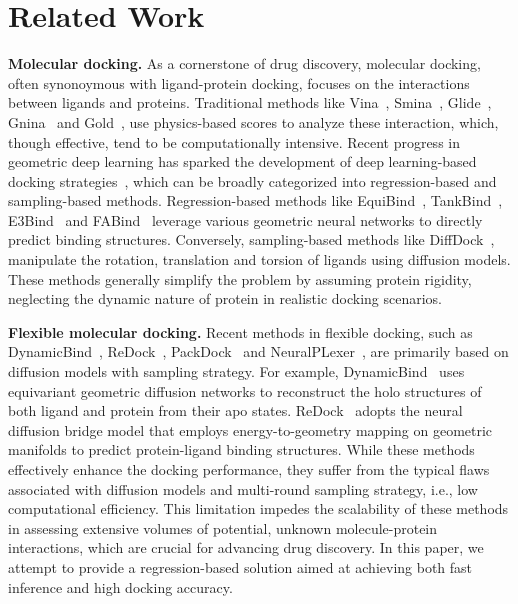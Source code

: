 \section{Related Work}
\label{Sec:RelatedWork}
\textbf{Molecular docking.} As a cornerstone of drug discovery, molecular docking, often synonoymous with ligand-protein docking, focuses on the interactions between ligands and proteins. Traditional methods like Vina~\citep{trott:2010:Vina}, Smina~\citep{koes:2013:Smina}, Glide~\citep{friesner:2004:Glide}, Gnina~\citep{mcnutt:2021:Gnina} and Gold~\citep{jones:1997:Gold}, use physics-based scores to analyze these interaction, which, though effective, tend to be computationally intensive. Recent progress in geometric deep learning has sparked the development of deep learning-based docking strategies~\citep{crampon:2022:DockingSurvey}, which can be broadly categorized into regression-based and sampling-based methods. Regression-based methods like EquiBind~\citep{stark:2022:ICML:Equibind}, TankBind~\citep{lu:2022:NIPS:tankbind}, E3Bind~\citep{zhang:2023:ICLR:E3bind} and FABind~\citep{pei:2024:NIPS:fabind} leverage various geometric neural networks to directly predict binding structures. Conversely, sampling-based methods like DiffDock~\citep{corso:2022:diffdock}, manipulate the rotation, translation and torsion of ligands using diffusion models. These methods generally simplify the problem by assuming protein rigidity, neglecting the dynamic nature of protein in realistic docking scenarios.

\par
\textbf{Flexible molecular docking.} Recent methods in flexible docking, such as DynamicBind~\citep{lu:2024:NatCom:dynamicbind}, ReDock~\citep{huang:2024:ReDock}, PackDock~\citep{zhang:2024:PackDock} and NeuralPLexer~\citep{qiao:2024:NeuralPLexer:NMI}, are primarily based on diffusion models with sampling strategy. For example, DynamicBind~\citep{lu:2024:NatCom:dynamicbind} uses equivariant geometric diffusion networks to reconstruct the holo structures of both ligand and protein from their apo states. ReDock~\citep{huang:2024:ReDock} adopts the neural diffusion bridge model that employs energy-to-geometry mapping on geometric manifolds to predict protein-ligand binding structures. While these methods effectively enhance the docking performance, they suffer from the typical flaws associated with diffusion models and multi-round sampling strategy, i.e., low computational efficiency. This limitation impedes the scalability of these methods in assessing extensive volumes of potential, unknown molecule-protein interactions, which are crucial for advancing drug discovery. In this paper, we attempt to provide a regression-based solution aimed at achieving both fast inference and high docking accuracy.